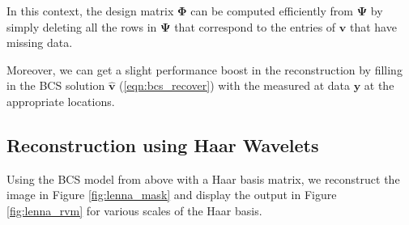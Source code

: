 In this context, the design matrix $\bm\Phi$ can be computed efficiently from $\bm\Psi$ by simply deleting all the rows in $\bm\Psi$ that correspond to the entries of $\bm v$ that have missing data.

Moreover, we can get a slight performance boost in the reconstruction by filling in the BCS solution $\bm{\hat v}$ (\ref{eqn:bcs_recover}) with the measured at data $\bm y$ at the appropriate locations.

\subsection{Reconstruction using Haar Wavelets}
\label{sect:interpol_haar}
Using the BCS model from above with a Haar basis matrix, we reconstruct the image in Figure \ref{fig:lenna_mask} and display the output in Figure \ref{fig:lenna_rvm} for various scales of the Haar basis.
